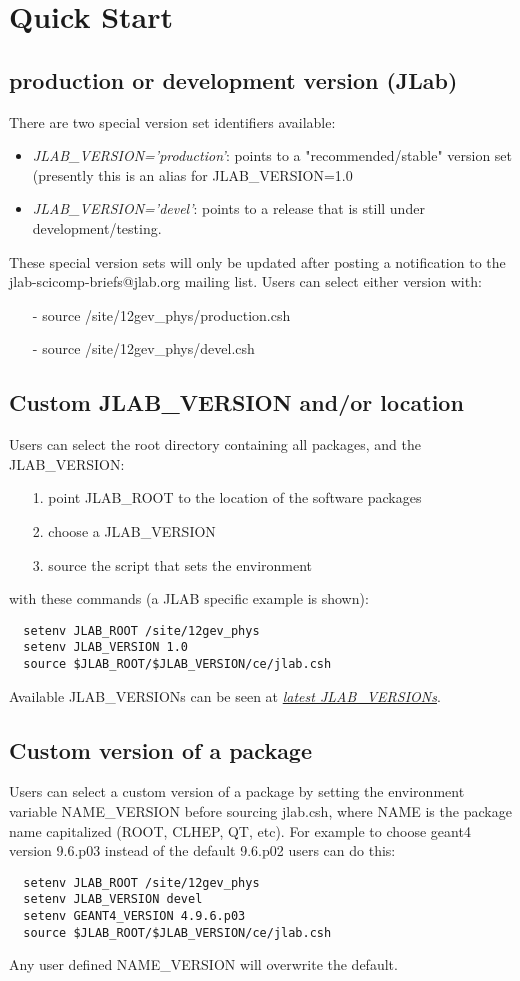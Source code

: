 \section{Quick Start}

\subsection{production or development version (JLab)}
There are two special version set identifiers available:
\begin{itemize}
\item {\it JLAB\_VERSION='production'}: points to a "recommended/stable" version
     set (presently this is an alias for JLAB\_VERSION=1.0
\item {\it JLAB\_VERSION='devel'}: points to a release that is still under
     development/testing.
\end{itemize}
 These special version sets will only be updated after posting a
 notification to the jlab-scicomp-briefs@jlab.org mailing list.
Users can select either version with:
\begin{itemize}
\item[-] source /site/12gev\_phys/production.csh
\item[-] source /site/12gev\_phys/devel.csh
\end{itemize}
\subsection{Custom JLAB\_VERSION and/or location}
Users can select the root directory containing all packages, and the JLAB\_VERSION:
\begin{itemize}
\item[1.] point JLAB\_ROOT to the location of the software packages
\item[2.] choose a JLAB\_VERSION
\item[3.] source the script that sets the environment
\end{itemize}
with these commands (a JLAB specific example is shown):

\begin{verbatim}
  setenv JLAB_ROOT /site/12gev_phys
  setenv JLAB_VERSION 1.0
  source $JLAB_ROOT/$JLAB_VERSION/ce/jlab.csh
\end{verbatim}
Available JLAB\_VERSIONs can be seen at 
\href{https://data.jlab.org/drupal/?q=node/55}{\it latest JLAB\_VERSIONs}.

\subsection{Custom version of a package}
Users can select a custom version of a package by setting the 
environment variable NAME\_VERSION before sourcing jlab.csh, where NAME is the package name capitalized (ROOT, CLHEP, QT, etc). 
For example to choose geant4 version 9.6.p03 instead of the default 9.6.p02 users can do this:
\begin{verbatim}
  setenv JLAB_ROOT /site/12gev_phys
  setenv JLAB_VERSION devel
  setenv GEANT4_VERSION 4.9.6.p03
  source $JLAB_ROOT/$JLAB_VERSION/ce/jlab.csh
\end{verbatim}
Any user defined NAME\_VERSION will overwrite the default. 

